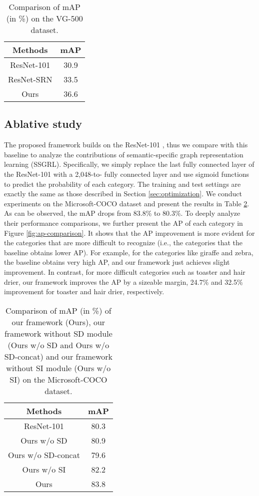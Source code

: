 \documentclass[10pt,twocolumn,letterpaper]{article}
\begin{document}
\begin{table}[!t]
\centering
\begin{tabular}{c|c}
\hline
\centering  Methods & mAP  \\
\hline
\hline
ResNet-101 \cite{he2016deep} & 30.9\\
ResNet-SRN \cite{zhu2017learning} & 33.5\\
\hline
Ours & 36.6  \\
\hline
\end{tabular}
\vspace{2pt}
\caption{Comparison of mAP (in \%) on the VG-500 dataset.}
\label{table:result-vg}
\end{table}


\subsection{Ablative study}
The proposed framework builds on the ResNet-101 \cite{he2016deep}, thus we compare with this baseline to analyze the contributions of semantic-specific graph representation learning (SSGRL). Specifically, we simply replace the last fully connected layer of the ResNet-101 with a 2,048-to- fully connected layer and use  sigmoid functions to predict the probability of each category. The training and test settings are exactly the same as those described in Section \ref{sec:optimization}. We conduct experiments on the Microsoft-COCO dataset and present the results in Table \ref{table:result-ablation}. As can be observed, the mAP drops from 83.8\% to 80.3\%. To deeply analyze their performance comparisons, we further present the AP of each category in Figure \ref{fig:ap-comparison}. It shows that the AP improvement is more evident for the categories that are more difficult to recognize (i.e., the categories that the baseline obtains lower AP). For example, for the categories like giraffe and zebra, the baseline obtains very high AP, and our framework just achieves slight improvement. In contrast, for more difficult categories such as toaster and hair drier, our framework improves the AP by a sizeable margin, 24.7\% and 32.5\% improvement for toaster and hair drier, respectively.

\begin{table}[!t]
\centering
\begin{tabular}{c|c}
\hline
\centering  Methods & mAP \\
\hline
\hline
ResNet-101 \cite{he2016deep} &80.3\\
\hline
Ours w/o SD & 80.9  \\
Ours w/o SD-concat & 79.6  \\
Ours w/o SI & 82.2  \\
Ours & 83.8   \\
\hline
\end{tabular}
\vspace{2pt}
\caption{Comparison of mAP (in \%) of our framework (Ours), our framework without SD module (Ours w/o SD and Ours w/o SD-concat) and our framework without SI module (Ours w/o SI) on the Microsoft-COCO dataset.}
\label{table:result-ablation}
\end{table}
\end{document}
